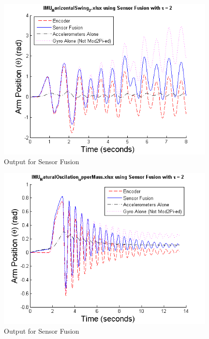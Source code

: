 \documentclass{article}
\theoremstyle{plain}
\theoremstyle{definition}
\theoremstyle{remark}
\begin{document}
\begin{figure}[hbt]
\begin{center}
\includegraphics[width = 11cm]{SF_out_6.png}
\caption{Output for Sensor Fusion}
\label{SF_out_6}
\end{center}
\end{figure}


\begin{figure}[hbt]
\begin{center}
\includegraphics[width = 11cm]{SF_out_2.png}
\caption{Output for Sensor Fusion}
\label{fusion_Block}
\end{center}
\end{figure}
\end{document}
